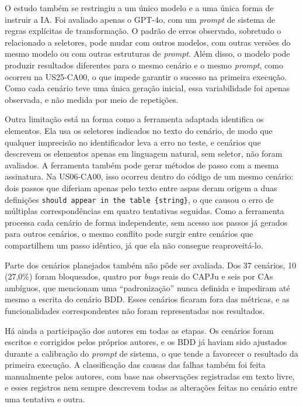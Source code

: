 O estudo também se restringiu a um único modelo e a uma única forma de instruir a IA. Foi avaliado apenas o GPT-4o, com um \textit{prompt} de sistema de regras explícitas de transformação. O padrão de erros observado, sobretudo o relacionado a seletores, pode mudar com outros modelos, com outras versões do mesmo modelo ou com outras estruturas de \textit{prompt}. Além disso, o modelo pode produzir resultados diferentes para o mesmo cenário e o mesmo \textit{prompt}, como ocorreu na US25-CA00, o que impede garantir o sucesso na primeira execução. Como cada cenário teve uma única geração inicial, essa variabilidade foi apenas observada, e não medida por meio de repetições.

Outra limitação está na forma como a ferramenta adaptada identifica os elementos. Ela usa os seletores indicados no texto do cenário, de modo que qualquer imprecisão no identificador leva a erro no teste, e cenários que descrevem os elementos apenas em linguagem natural, sem seletor, não foram avaliados. A ferramenta também pode gerar métodos de passo com a mesma assinatura. Na US06-CA00, isso ocorreu dentro do código de um mesmo cenário: dois passos que diferiam apenas pelo texto entre aspas deram origem a duas definições \texttt{should appear in the table \{string\}}, o que causou o erro de múltiplas correspondências em quatro tentativas seguidas. Como a ferramenta processa cada cenário de forma independente, sem acesso aos passos já gerados para outros cenários, o mesmo conflito pode surgir entre cenários que compartilhem um passo idêntico, já que ela não consegue reaproveitá-lo.

Parte dos cenários planejados também não pôde ser avaliada. Dos 37 cenários, 10 (27,0\%) foram bloqueados, quatro por \textit{bugs} reais do CAPJu e seis por CAs ambíguos, que mencionam uma ``padronização'' nunca definida e impediram até mesmo a escrita do cenário BDD. Esses cenários ficaram fora das métricas, e as funcionalidades correspondentes não foram representadas nos resultados.

Há ainda a participação dos autores em todas as etapas. Os cenários foram escritos e corrigidos pelos próprios autores, e os BDD já haviam sido ajustados durante a calibração do \textit{prompt} de sistema, o que tende a favorecer o resultado da primeira execução. A classificação das causas das falhas também foi feita manualmente pelos autores, com base nas observações registradas em texto livre, e esses registros nem sempre descrevem todas as alterações feitas no cenário entre uma tentativa e outra.

